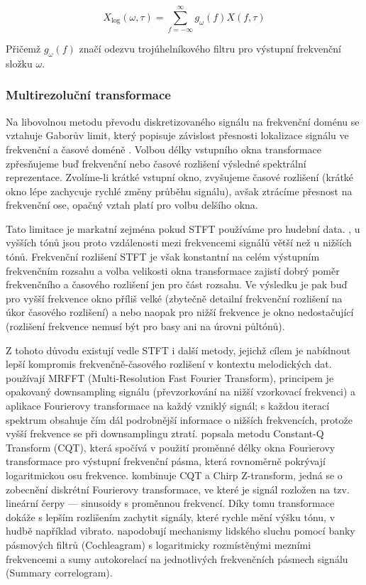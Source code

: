 $$ X_{\mathrm{log}}(\omega, \tau) = \sum^{\infty}_{f=-\infty}{g_\omega(f)X(f, \tau)}$$

Přičemž $g_\omega(f)$ značí odezvu trojúhelníkového filtru pro výstupní frekvenční složku $\omega$.

\subsubsection{Multirezoluční transformace}

Na libovolnou metodu převodu diskretizovaného signálu na frekvenční doménu se vztahuje Gaborův limit, který popisuje závislost přesnosti lokalizace signálu ve frekvenční a časové doméně \citep{Gabor1945}. Volbou délky vstupního okna transformace zpřesňujeme buď frekvenční nebo časové rozlišení výsledné spektrální reprezentace. Zvolíme-li krátké vstupní okno, zvyšujeme časové rozlišení (krátké okno lépe zachycuje rychlé změny průběhu signálu), avšak ztrácíme přesnost na frekvenční ose, opačný vztah platí pro volbu delšího okna.

Tato limitace je markatní zejména pokud STFT používáme pro hudební data. , u vyšších tónů jsou proto vzdálenosti mezi frekvencemi signálů větší než u nižších tónů. Frekvenční rozlišení STFT je však konstantní na celém výstupním frekvenčním rozsahu a volba velikosti okna transformace zajistí dobrý poměr frekvenčního a časového rozlišení jen pro část rozsahu. Ve výsledku je pak buď pro vyšší frekvence okno příliš velké (zbytečně detailní frekvenční rozlišení na úkor časového rozlišení) a nebo naopak pro nižší frekvence je okno nedostačující (rozlišení frekvence nemusí být pro basy ani na úrovni půltónů).

Z tohoto důvodu existují vedle STFT i další metody, jejichž cílem je nabídnout lepší kompromis frekvenčně-časového rozlišení v kontextu melodických dat. \cite{Goto1999} používají MRFFT (Multi-Resolution Fast Fourier Transform), principem je opakovaný downsampling signálu (převzorkování na nižší vzorkovací frekvenci) a aplikace Fourierovy transformace na každý vzniklý signál; s každou iterací spektrum obsahuje čím dál podrobnější informace o nižších frekvencích, protože vyšší frekvence se při downsamplingu ztratí. \cite{Brown1990} popsala metodu Constant-Q Transform (CQT), která spočívá v použití proměnné délky okna Fourierovy transformace pro výstupní frekvenční pásma, která rovnoměrně pokrývají logaritmickou osu frekvence. \cite{Cancela2010} kombinuje CQT a Chirp Z-transform, jedná se o zobecnění diskrétní Fourierovy transformace, ve které je signál rozložen na tzv. lineární čerpy --- sinusoidy s proměnnou frekvencí. Díky tomu transformace dokáže s lepším rozlišením zachytit signály, které rychle mění výšku tónu, v hudbě například vibrato. \cite{Paiva2004} napodobují mechanismy lidského sluchu pomocí banky pásmových filtrů (Cochleagram) s logaritmicky rozmístěnými mezními frekvencemi a sumy autokorelací na jednotlivých frekvenčních pásmech signálu (Summary correlogram).

